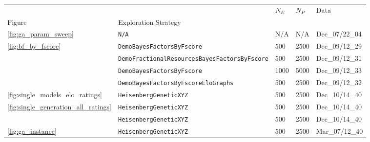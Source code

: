 \begin{tabular}{lllll}
\hline
                        &                                                      &                                    $N_E$ &                                    $N_P$ &                                     Data \\
Figure & Exploration Strategy &                                          &                                          &                                          \\
\midrule
\cref{fig:ga_param_sweep} & \texttt{N/A} &                                      N/A &                                      N/A &                           Dec\_07/22\_04 \\
\cline{1-5}
\multirow{4}{*}{\cref{fig:bf_by_fscore}} & \texttt{DemoBayesFactorsByFscore} &                                      500 &                                     2500 &                           Dec\_09/12\_29 \\
                        & \texttt{DemoFractionalResourcesBayesFactorsByFscore} &                                      500 &                                     2500 &                           Dec\_09/12\_31 \\
                        & \texttt{DemoBayesFactorsByFscore} &                                     1000 &                                     5000 &                           Dec\_09/12\_33 \\
                        & \texttt{DemoBayesFactorsByFscoreEloGraphs} &                                      500 &                                     2500 &                           Dec\_09/12\_32 \\
\cline{1-5}
\cref{fig:single_models_elo_ratings} & \texttt{HeisenbergGeneticXYZ} &                                      500 &                                     2500 &                           Dec\_10/14\_40 \\
\cline{1-5}
\multirow{2}{*}{\cref{fig:single_generation_all_ratings}} & \texttt{HeisenbergGeneticXYZ} &                                      500 &                                     2500 &                           Dec\_10/14\_40 \\
                        & \texttt{HeisenbergGeneticXYZ} &                                      500 &                                     2500 &                           Dec\_10/14\_40 \\
\cline{1-5}
\multirow{2}{*}{\cref{fig:ga_instance}} & \texttt{HeisenbergGeneticXYZ} &                                      500 &                                     2500 &                           Mar\_07/12\_40 \\

\end{tabular}
